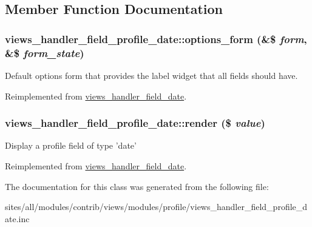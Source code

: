 \subsection{Member Function Documentation}
\hypertarget{classviews__handler__field__profile__date_ede3f5f93411ff64dd780b9837d19aec}{
\subsubsection[{options\_\-form}]{\setlength{\rightskip}{0pt plus 5cm}views\_\-handler\_\-field\_\-profile\_\-date::options\_\-form (\&\$ {\em form}, \/  \&\$ {\em form\_\-state})}}
\label{classviews__handler__field__profile__date_ede3f5f93411ff64dd780b9837d19aec}


Default options form that provides the label widget that all fields should have. 

Reimplemented from \hyperlink{classviews__handler__field__date_cc152b1ff3dd0a65bc4d372c97c7c8e0}{views\_\-handler\_\-field\_\-date}.\hypertarget{classviews__handler__field__profile__date_63151e2577405b9fec938ed9ff5926d4}{
\subsubsection[{render}]{\setlength{\rightskip}{0pt plus 5cm}views\_\-handler\_\-field\_\-profile\_\-date::render (\$ {\em value})}}
\label{classviews__handler__field__profile__date_63151e2577405b9fec938ed9ff5926d4}


Display a profile field of type 'date' 

Reimplemented from \hyperlink{classviews__handler__field__date_4ed821df9270dc90bd3c2103d7136d47}{views\_\-handler\_\-field\_\-date}.

The documentation for this class was generated from the following file:\begin{CompactItemize}
\item 
sites/all/modules/contrib/views/modules/profile/views\_\-handler\_\-field\_\-profile\_\-date.inc\end{CompactItemize}

